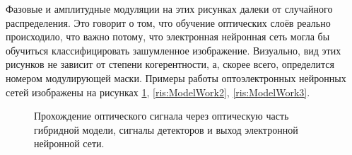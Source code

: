 Фазовые и амплитудные модуляции на этих рисунках далеки от случайного распределения. Это говорит о том, что обучение оптических слоёв реально происходило, что важно потому, что электронная нейронная сеть могла бы обучиться классифицировать зашумленное изображение. Визуально, вид этих рисунков не зависит от степени когерентности, а, скорее всего, определится номером модулирующей маски.
Примеры работы оптоэлектронных нейронных сетей изображены на рисунках \ref{ris:ModelWork1}, \ref{ris:ModelWork2}, \ref{ris:ModelWork3}.
\begin{figure}[h]
	\caption{Прохождение оптического сигнала через оптическую часть гибридной модели, сигналы детекторов и выход электронной нейронной сети.}
	\label{ris:ModelWork1}
\end{figure}
